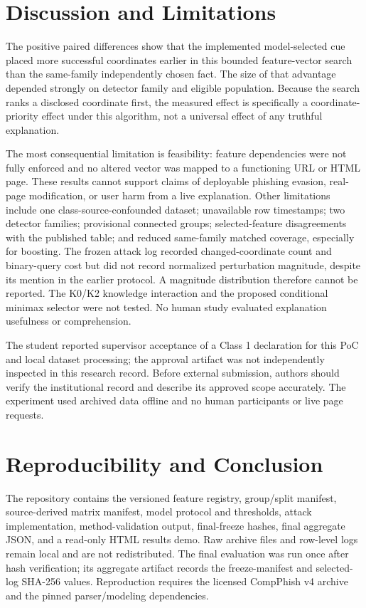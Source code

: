\documentclass{ieeeaccess}
\begin{document}
\section{Discussion and Limitations}
The positive paired differences show that the implemented model-selected cue placed more successful coordinates earlier in this bounded feature-vector search than the same-family independently chosen fact. The size of that advantage depended strongly on detector family and eligible population. Because the search ranks a disclosed coordinate first, the measured effect is specifically a coordinate-priority effect under this algorithm, not a universal effect of any truthful explanation.

The most consequential limitation is feasibility: feature dependencies were not fully enforced and no altered vector was mapped to a functioning URL or HTML page. These results cannot support claims of deployable phishing evasion, real-page modification, or user harm from a live explanation. Other limitations include one class-source-confounded dataset; unavailable row timestamps; two detector families; provisional connected groups; selected-feature disagreements with the published table; and reduced same-family matched coverage, especially for boosting. The frozen attack log recorded changed-coordinate count and binary-query cost but did not record normalized perturbation magnitude, despite its mention in the earlier protocol. A magnitude distribution therefore cannot be reported. The K0/K2 knowledge interaction and the proposed conditional minimax selector were not tested. No human study evaluated explanation usefulness or comprehension.

The student reported supervisor acceptance of a Class 1 declaration for this PoC and local dataset processing; the approval artifact was not independently inspected in this research record. Before external submission, authors should verify the institutional record and describe its approved scope accurately. The experiment used archived data offline and no human participants or live page requests.

\section{Reproducibility and Conclusion}
The repository contains the versioned feature registry, group/split manifest, source-derived matrix manifest, model protocol and thresholds, attack implementation, method-validation output, final-freeze hashes, final aggregate JSON, and a read-only HTML results demo. Raw archive files and row-level logs remain local and are not redistributed. The final evaluation was run once after hash verification; its aggregate artifact records the freeze-manifest and selected-log SHA-256 values. Reproduction requires the licensed CompPhish v4 archive and the pinned parser/modeling dependencies.
\end{document}
